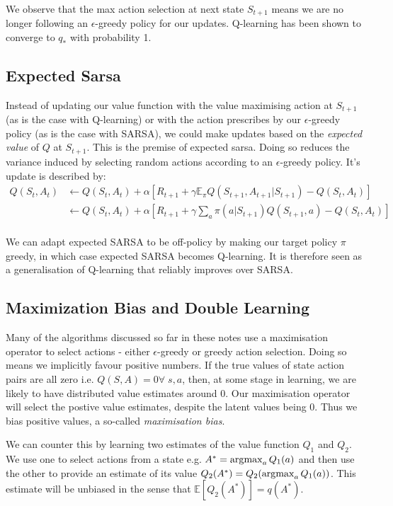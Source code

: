 We observe that the max action selection at next state $S_{t+1}$ means we are no longer following an $\epsilon$-greedy policy for our updates. Q-learning has been shown to converge to $q_*$ with probability 1.

\subsection{Expected Sarsa}
Instead of updating our value function with the value maximising action at $S_{t+1}$ (as is the case with Q-learning) or with the action prescribes by our $\epsilon$-greedy policy (as is the case with SARSA), we could make updates based on the \textit{expected value} of $Q$ at $S_{t+1}$. This is the premise of expected sarsa. Doing so reduces the variance induced by selecting random actions according to an $\epsilon$-greedy policy. It's update is described by:
\begin{align}
Q(S_t, A_t) &\leftarrow Q(S_t, A_t) + \alpha \left[R_{t+1} + \gamma \mathbb{E}_\pi Q(S_{t+1}, A_{t+1} | S_{t+1}) - Q(S_t, A_t) \right] \\
&\leftarrow Q(S_t, A_t) + \alpha \left[R_{t+1} + \gamma \sum_{a} \pi(a | S_{t+1}) Q(S_{t+1}, a) - Q(S_t, A_t) \right] \\
\end{align}

We can adapt expected SARSA to be off-policy by making our target policy $\pi$ greedy, in which case expected SARSA becomes Q-learning. It is therefore seen as a generalisation of Q-learning that reliably improves over SARSA.

\subsection{Maximization Bias and Double Learning}
Many of the algorithms discussed so far in these notes use a maximisation operator to select actions - either $\epsilon$-greedy or greedy action selection. Doing so means we implicitly favour positive numbers. If the true values of state action pairs are all zero i.e. $Q(S,A) = 0 \forall \; s, a$, then, at some stage in learning, we are likely to have distributed value estimates around 0. Our maximisation operator will select the postive value estimates, despite the latent values being 0. Thus we bias positive values, a so-called \textit{maximisation bias}.

We can counter this by learning two estimates of the value function $Q_1$ and $Q_2$. We use one to select actions from a state e.g. $A^* = \operatorname*{\arg\!\max}_a Q_1(a)$ and then use the other to provide an estimate of its value $Q_2(A^*) = Q_2(\operatorname*{\arg\!\max}_a Q_1(a))$. This estimate will be unbiased in the sense that $\mathbb{E}\left[Q_2(A^*)\right] = q(A^*)$. 

